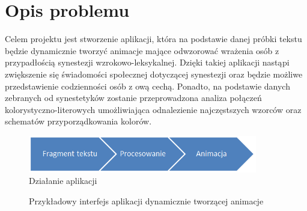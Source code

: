 \documentclass[12pt]{article}
\begin{document}
\section{Opis problemu}
	Celem projektu jest stworzenie aplikacji, która na podstawie danej próbki tekstu będzie dynamicznie tworzyć animacje mające odwzorować wrażenia osób z przypadłością synestezji wzrokowo-leksykalnej. Dzięki takiej aplikacji nastąpi zwiększenie się świadomości społecznej dotyczącej synestezji oraz będzie możliwe przedstawienie codzienności osób z ową cechą. Ponadto, na podstawie danych zebranych od synestetyków zostanie przeprowadzona analiza połączeń kolorystyczno-literowych umożliwiająca odnalezienie najczęstszych wzorców oraz schematów przyporządkowania kolorów.
\begin{figure}[ht!]
	\centering
	\includegraphics[width=10cm]{Capture.PNG}
	\caption{Działanie aplikacji}
\end{figure} 
\begin{figure}[ht!]
	\centering
	\caption{Przykładowy interfejs aplikacji dynamicznie tworzącej animacje}
\end{figure}
\end{document}
